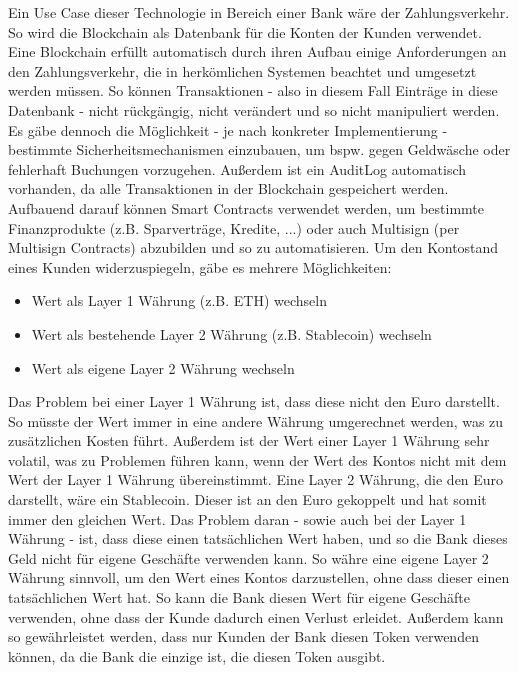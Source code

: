 Ein Use Case dieser Technologie in Bereich einer Bank wäre der Zahlungsverkehr. 
So wird die Blockchain als Datenbank für die Konten der Kunden verwendet.
Eine Blockchain erfüllt automatisch durch ihren Aufbau einige Anforderungen an den Zahlungsverkehr, die in herkömlichen Systemen beachtet und umgesetzt werden müssen. 
So können Transaktionen - also in diesem Fall Einträge in diese Datenbank - nicht rückgängig, nicht verändert und so nicht manipuliert werden. 
Es gäbe dennoch die Möglichkeit - je nach konkreter Implementierung - bestimmte Sicherheitsmechanismen einzubauen, um bspw. gegen Geldwäsche oder fehlerhaft Buchungen vorzugehen. %
Außerdem ist ein AuditLog automatisch vorhanden, da alle Transaktionen in der Blockchain gespeichert werden.
Aufbauend darauf können Smart Contracts verwendet werden, um bestimmte Finanzprodukte (z.B. Sparverträge, Kredite, ...) oder auch Multisign (per Multisign Contracts) abzubilden und so zu automatisieren. %
Um den Kontostand eines Kunden widerzuspiegeln, gäbe es mehrere Möglichkeiten:
\begin{itemize}
    \item Wert als Layer 1 Währung (z.B. ETH) wechseln
    \item Wert als bestehende Layer 2 Währung (z.B. Stablecoin) wechseln
    \item Wert als eigene Layer 2 Währung wechseln
\end{itemize}
Das Problem bei einer Layer 1 Währung ist, dass diese nicht den Euro darstellt. 
So müsste der Wert immer in eine andere Währung umgerechnet werden, was zu zusätzlichen Kosten führt. Außerdem ist der Wert einer Layer 1 Währung sehr volatil, was zu Problemen führen kann, wenn der Wert des Kontos nicht mit dem Wert der Layer 1 Währung übereinstimmt.
Eine Layer 2 Währung, die den Euro darstellt, wäre ein Stablecoin. Dieser ist an den Euro gekoppelt und hat somit immer den gleichen Wert. 
Das Problem daran - sowie auch bei der Layer 1 Währung - ist, dass diese einen tatsächlichen Wert haben, und so die Bank dieses Geld nicht für eigene Geschäfte verwenden kann.
So währe eine eigene Layer 2 Währung sinnvoll, um den Wert eines Kontos darzustellen, ohne dass dieser einen tatsächlichen Wert hat. So kann die Bank diesen Wert für eigene Geschäfte verwenden, ohne dass der Kunde dadurch einen Verlust erleidet. 
Außerdem kann so gewährleistet werden, dass nur Kunden der Bank diesen Token verwenden können, da die Bank die einzige ist, die diesen Token ausgibt.
\bigbreak